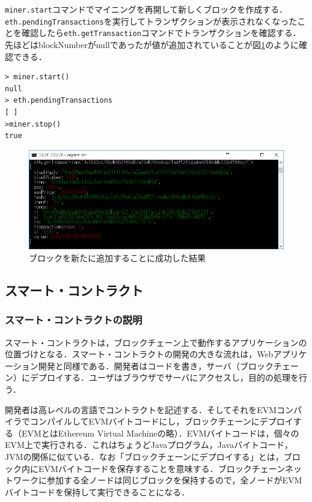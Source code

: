 \texttt{miner.start}コマンドでマイニングを再開して新しくブロックを作成する．\texttt{eth.pendingTransactions}を実行してトランザクションが表示されなくなったことを確認したら\texttt{eth.getTransaction}コマンドでトランザクションを確認する．先ほどはblockNumberがnullであったが値が追加されていることが図\ref{gettransaction}のように確認できる．
\begin{verbatim}
> miner.start()
null
> eth.pendingTransactions
[ ]
>miner.stop()
true
\end{verbatim}
\begin{figure}[htb]
\centering
\includegraphics[width=12cm]{images/gettransaction.png}
\caption{ブロックを新たに追加することに成功した結果}\label{gettransaction}
\end{figure}



\newpage
\subsection{スマート・コントラクト}\label{smart}
\subsubsection{スマート・コントラクトの説明}
スマート・コントラクトは，ブロックチェーン上で動作するアプリケーションの位置づけとなる．スマート・コントラクトの開発の大きな流れは，Webアプリケーション開発と同様である．開発者はコードを書き，サーバ（ブロックチェーン）にデプロイする．ユーザはブラウザでサーバにアクセスし，目的の処理を行う．

開発者は高レベルの言語でコントラクトを記述する．そしてそれをEVMコンパイラでコンパイルしてEVMバイトコードにし，ブロックチェーンにデプロイする（EVMとはEthereum Virtual Machineの略）．EVMバイトコードは，個々のEVM上で実行される．これはちょうどJavaプログラム，Javaバイトコード，JVMの関係に似ている．なお「ブロックチェーンにデプロイする」とは，ブロック内にEVMバイトコードを保存することを意味する．ブロックチェーンネットワークに参加する全ノードは同じブロックを保持するので，全ノードがEVMバイトコードを保持して実行できることになる．

